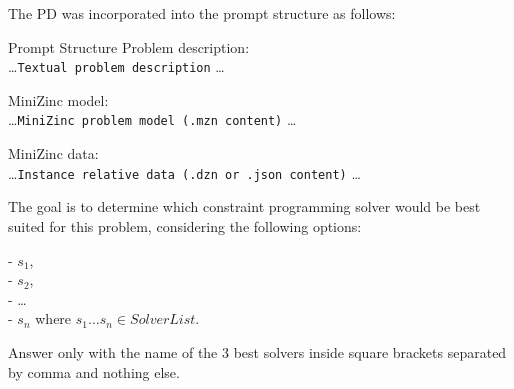\documentclass[../../main]{subfiles}
\begin{document}
The PD was incorporated into the prompt structure as follows:
\begin{definition}{Prompt Structure}
    Problem description:\\
    \ldots \texttt{Textual problem description} \ldots

    MiniZinc model:\\
    \ldots \texttt{MiniZinc problem model (\texttt{.mzn} content)} \ldots

    \vspace{0.5em}
    MiniZinc data:\\
    \ldots \texttt{Instance relative data (\texttt{.dzn} or \texttt{.json} content)} \ldots

    \vspace{0.5em}
    The goal is to determine which constraint programming solver would be best suited for this problem, considering the following options:

        - $s_1$,\\
        - $s_2$,\\
        - \ldots\\
        - $s_n$
    where $s_1 \ldots s_n \in SolverList$.

    Answer only with the name of the 3 best solvers inside square brackets separated by comma and nothing else.

\end{definition}
\begin{table}[ht]
    \centering
    \caption{Test on sanitized scripts combined with textual problem description. Columns are calculated as in .}
    \label{tab:combinedpDesc3}
\end{table}
\end{document}
